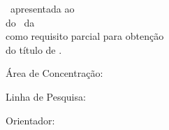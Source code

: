 \begin{titlepage}
    
    \begin{center}
        \vspace*{2cm}
        \large\textbf{\autor}
        \vspace{4cm}
        
        \Huge\textbf{\titulo}
        \vspace{2cm}
        
        \large{\tipotxt\ apresentada ao \programa \\
        do \institutenome\ da \universidade \\
        como requisito parcial para obtenção \\
        do título de \grautxt.}
        \vspace{0.5cm}
        
        \large{Área de Concentração: \area}
        \vspace{0.5cm}
        
        \large{Linha de Pesquisa: \linhapesquisa}
        \vspace{2cm}
        
        \large{Orientador: \orientadornome}
        \vspace{3cm}
        
        \large\textbf{\cidade}
        \vspace{0.1cm}
        \large\textbf{\ano}
    \end{center}
    
\end{titlepage}